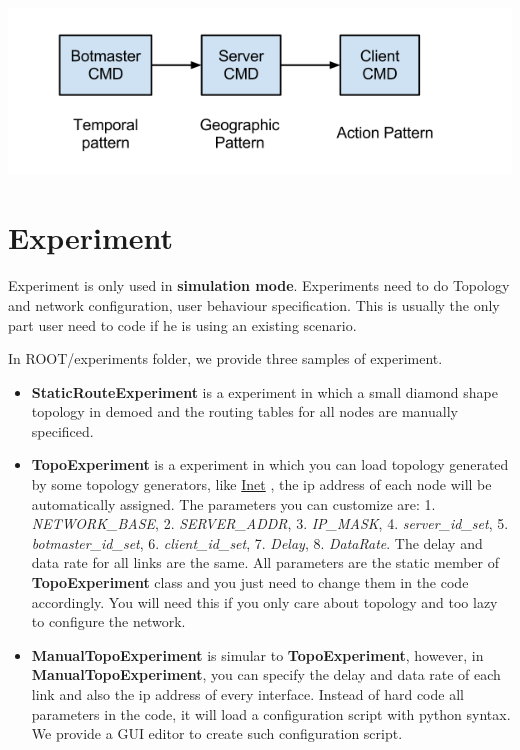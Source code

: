 \documentclass[letterpaper,10pt,english]{sphinxmanual}
\begin{document}
{\hfill\includegraphics{ImalseCMD.png}\hfill}


\section{Experiment}
\label{index:experiment}
Experiment is only used in \textbf{simulation mode}. Experiments need to do Topology
and network configuration, user behaviour specification. This is usually the
only part user need to code if he is using an existing scenario.

In ROOT/experiments folder, we provide three samples of experiment.
\begin{itemize}
\item {} 
\textbf{StaticRouteExperiment} is a experiment in which a small diamond shape
topology in demoed and the routing tables for all nodes are manually
specificed.

\item {} 
\textbf{TopoExperiment} is a experiment in which you can load topology
generated by some topology generators, like \href{http://topology.eecs.umich.edu/inet/}{Inet} , the ip address of each node
will be automatically assigned. The parameters you can customize are: 1.
\emph{NETWORK\_BASE}, 2. \emph{SERVER\_ADDR}, 3. \emph{IP\_MASK}, 4. \emph{server\_id\_set}, 5.
\emph{botmaster\_id\_set}, 6. \emph{client\_id\_set}, 7. \emph{Delay}, 8. \emph{DataRate}. The
delay and data rate for all links are the same. All parameters are the
static member of \textbf{TopoExperiment} class and you just need to change them
in the code accordingly.  You will need this if you only care about
topology and too lazy to configure the network.

\item {} 
\textbf{ManualTopoExperiment} is simular to \textbf{TopoExperiment}, however, in
\textbf{ManualTopoExperiment}, you can specify the delay and data rate of each
link and also the ip address of every interface. Instead of hard code all
parameters in the code, it will load a configuration script with python
syntax. We provide a GUI editor to create such configuration script.

\end{itemize}
\end{document}
